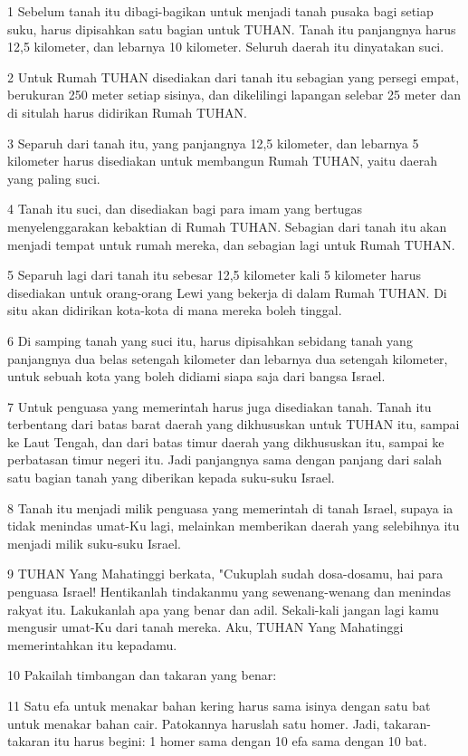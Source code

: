 \par 1 Sebelum tanah itu dibagi-bagikan untuk menjadi tanah pusaka bagi setiap suku, harus dipisahkan satu bagian untuk TUHAN. Tanah itu panjangnya harus 12,5 kilometer, dan lebarnya 10 kilometer. Seluruh daerah itu dinyatakan suci.
\par 2 Untuk Rumah TUHAN disediakan dari tanah itu sebagian yang persegi empat, berukuran 250 meter setiap sisinya, dan dikelilingi lapangan selebar 25 meter dan di situlah harus didirikan Rumah TUHAN.
\par 3 Separuh dari tanah itu, yang panjangnya 12,5 kilometer, dan lebarnya 5 kilometer harus disediakan untuk membangun Rumah TUHAN, yaitu daerah yang paling suci.
\par 4 Tanah itu suci, dan disediakan bagi para imam yang bertugas menyelenggarakan kebaktian di Rumah TUHAN. Sebagian dari tanah itu akan menjadi tempat untuk rumah mereka, dan sebagian lagi untuk Rumah TUHAN.
\par 5 Separuh lagi dari tanah itu sebesar 12,5 kilometer kali 5 kilometer harus disediakan untuk orang-orang Lewi yang bekerja di dalam Rumah TUHAN. Di situ akan didirikan kota-kota di mana mereka boleh tinggal.
\par 6 Di samping tanah yang suci itu, harus dipisahkan sebidang tanah yang panjangnya dua belas setengah kilometer dan lebarnya dua setengah kilometer, untuk sebuah kota yang boleh didiami siapa saja dari bangsa Israel.
\par 7 Untuk penguasa yang memerintah harus juga disediakan tanah. Tanah itu terbentang dari batas barat daerah yang dikhususkan untuk TUHAN itu, sampai ke Laut Tengah, dan dari batas timur daerah yang dikhususkan itu, sampai ke perbatasan timur negeri itu. Jadi panjangnya sama dengan panjang dari salah satu bagian tanah yang diberikan kepada suku-suku Israel.
\par 8 Tanah itu menjadi milik penguasa yang memerintah di tanah Israel, supaya ia tidak menindas umat-Ku lagi, melainkan memberikan daerah yang selebihnya itu menjadi milik suku-suku Israel.
\par 9 TUHAN Yang Mahatinggi berkata, "Cukuplah sudah dosa-dosamu, hai para penguasa Israel! Hentikanlah tindakanmu yang sewenang-wenang dan menindas rakyat itu. Lakukanlah apa yang benar dan adil. Sekali-kali jangan lagi kamu mengusir umat-Ku dari tanah mereka. Aku, TUHAN Yang Mahatinggi memerintahkan itu kepadamu.
\par 10 Pakailah timbangan dan takaran yang benar:
\par 11 Satu efa untuk menakar bahan kering harus sama isinya dengan satu bat untuk menakar bahan cair. Patokannya haruslah satu homer. Jadi, takaran-takaran itu harus begini: 1 homer sama dengan 10 efa sama dengan 10 bat.
